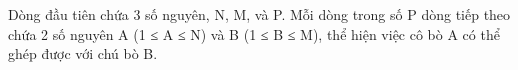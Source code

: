 Dòng đầu tiên chứa 3 số nguyên, N, M, và P. Mỗi dòng trong số P dòng tiếp theo chứa 2 số nguyên A (1 ≤ A ≤ N) và B (1 ≤ B ≤ M), thể hiện việc cô bò A có thể ghép được với chú bò B.  

\